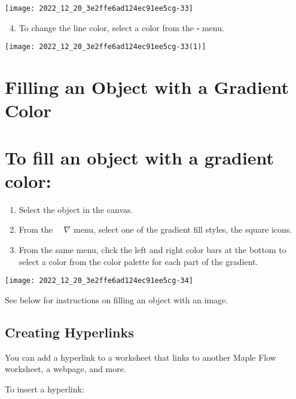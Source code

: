 \begin{center}
\texttt{[image: 2022\_12\_20\_3e2ffe6ad124ec91ee5cg-33]}
\end{center}

\begin{enumerate}
  \setcounter{enumi}{3}
  \item To change the line color, select a color from the $\square$ menu.
\end{enumerate}

\begin{center}
\texttt{[image: 2022\_12\_20\_3e2ffe6ad124ec91ee5cg-33(1)]}
\end{center}

\section{Filling an Object with a Gradient Color}
\section{To fill an object with a gradient color:}
\begin{enumerate}
  \item Select the object in the canvas.

  \item From the $\quad \nabla$ menu, select one of the gradient fill styles, the square icons.

  \item From the same menu, click the left and right color bars at the bottom to select a color from the color palette for each part of the gradient.

\end{enumerate}

\begin{center}
\texttt{[image: 2022\_12\_20\_3e2ffe6ad124ec91ee5cg-34]}
\end{center}

See below for instructions on filling an object with an image.

\subsection{Creating Hyperlinks}
You can add a hyperlink to a worksheet that links to another Maple Flow worksheet, a webpage, and more.

To insert a hyperlink:

